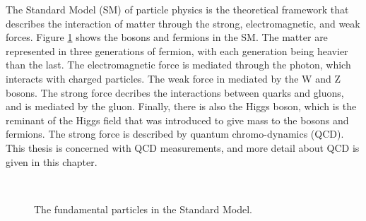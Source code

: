 The Standard Model (SM) of particle physics is the theoretical framework that describes the interaction of matter through the strong, electromagnetic, and weak forces.
Figure \ref{Theory:SM} shows the bosons and fermions in the SM.
The matter are represented in three generations of fermion, with each generation being heavier than the last. 
The electromagnetic force is mediated through the photon, which interacts with charged particles.
The weak force in mediated by the W and Z bosons.
The strong force decribes the interactions between quarks and gluons, and is mediated by the gluon.
Finally, there is also the Higgs boson, which is the reminant of the Higgs field that was introduced to give mass to the bosons and fermions.
The strong force is described by quantum chromo-dynamics (QCD).
This thesis is concerned with QCD measurements, and more detail about QCD is given in this chapter.


\begin{figure}
\centering
\mbox{
                              }
\caption[The fundamental particles in the Standard Model]{
The fundamental particles in the Standard Model.
\label{Theory:SM}}
\end{figure}

